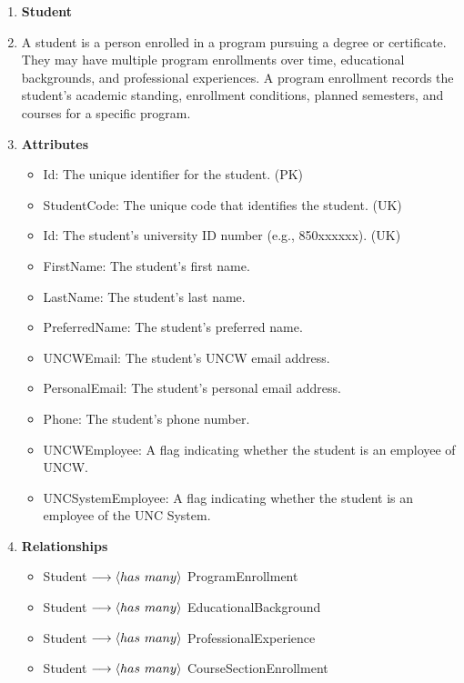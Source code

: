 \documentclass[12pt]{article}
\begin{document}
\begin{appendices}
\begin{enumerate}[label=(\roman*)]
    \item \textbf{Student}
    \item[] A student is a person enrolled in a program pursuing a degree or certificate. They may have multiple program enrollments over time, educational backgrounds, and professional experiences. A program enrollment records the student's academic standing, enrollment conditions, planned semesters, and courses for a specific program.
    \item[] \textbf{Attributes}
    \begin{itemize}
        \item Id: The unique identifier for the student. (PK)
        \item StudentCode: The unique code that identifies the student. (UK)
        \item Id: The student's university ID number (e.g., 850xxxxxx). (UK)
        \item FirstName: The student's first name.
        \item LastName: The student's last name.
        \item PreferredName: The student's preferred name.
        \item UNCWEmail: The student's UNCW email address.
        \item PersonalEmail: The student's personal email address.
        \item Phone: The student's phone number.
        \item UNCWEmployee: A flag indicating whether the student is an employee of UNCW.
        \item UNCSystemEmployee: A flag indicating whether the student is an employee of the UNC System.
    \end{itemize}
    \item[] \textbf{Relationships}
    \begin{itemize}
        \item Student $ \longrightarrow \langle has \hspace{0.125cm} many \rangle $ ProgramEnrollment
        \item Student $ \longrightarrow \langle has \hspace{0.125cm} many \rangle $ EducationalBackground
        \item Student $ \longrightarrow \langle has \hspace{0.125cm} many \rangle $ ProfessionalExperience
        \item Student $ \longrightarrow \langle has \hspace{0.125cm} many \rangle $ CourseSectionEnrollment
    \end{itemize}
\end{enumerate}




\end{appendices}
\end{document}
